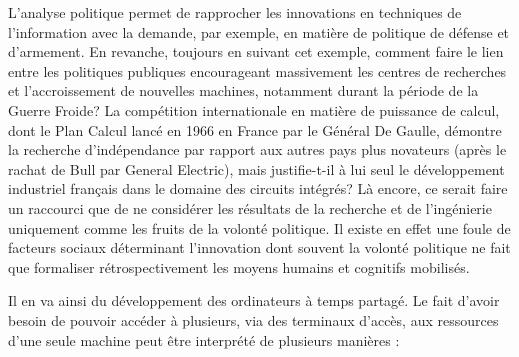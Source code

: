 \documentclass{FramateX}
\begin{document}
\begin{refsection}
L'analyse politique permet de rapprocher les
innovations en techniques de l'information avec la
demande, par exemple, en matière de politique de défense et
d'armement. En revanche, toujours en suivant cet
exemple, comment faire le lien entre les politiques publiques
encourageant massivement les centres de recherches et
l'accroissement de nouvelles machines, notamment
durant la période de la Guerre Froide? La compétition internationale en
matière de puissance de calcul, dont le Plan Calcul lancé en 1966 en
France par le Général De Gaulle, démontre la recherche
d'indépendance par rapport aux autres pays plus
novateurs (après le rachat de Bull par General Electric), mais
justifie-t-il à lui seul le développement industriel français dans le
domaine des circuits intégrés? Là encore, ce serait faire un raccourci
que de ne considérer les résultats de la recherche et de
l'ingénierie uniquement comme les fruits de la volonté
politique. Il existe en effet une foule de facteurs sociaux déterminant
l'innovation dont souvent la volonté politique ne fait
que formaliser rétrospectivement les moyens humains et cognitifs
mobilisés.

Il en va ainsi du développement des ordinateurs à temps partagé. Le fait
d'avoir besoin de pouvoir accéder à plusieurs, via des
terminaux d'accès, aux ressources
d'une seule machine peut être interprété de plusieurs
manières :


\end{refsection}
\end{document}
